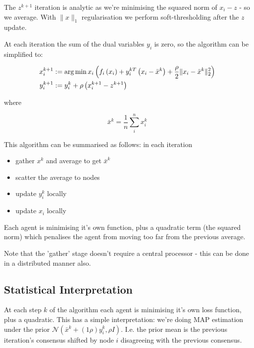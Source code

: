 \documentclass{article}
\begin{document}
\begin{example}[Consensus]
The \(z^{k+1}\) iteration is analytic as we're minimising the squared norm of \(x_i - z\) - so we average. With \(\|x\|_1\) regularisation we perform soft-thresholding after the \(z\) update.

At each iteration the sum of the dual variables \(y_i\) is zero, so the algorithm can be simplified to:

\begin{align}
x_i^{k+1} &:= \operatorname*{arg\,min}{x_i} \left(f_i\left( x_i \right) + y_i^{kT}\left(x_i-\bar{x}^k\right) + \frac{\rho}{2}\|x_i-\bar{x}^k\|_2^2\right)\\
y_i^{k+1} &:= y_i^{k} + \rho \left(x_i^{k+1} - z^{k+1} \right)
\label{simple_consensus_iterations}
\end{align}
 
where

\begin{equation}
\bar{x}^k = \frac{1}{n} \sum_i^n x_i^k
\end{equation}

This algorithm can be summarised as follows: in each iteration

\begin{itemize}
\item gather \(x^k\) and average to get \(\bar{x}^k\)
\item scatter the average to nodes
\item update \(y_i^k\) locally
\item update \(x_i\) locally
\end{itemize}

Each agent is minimising it's own function, plus a quadratic term (the squared norm) which penalises the agent from moving too far from the previous average.

Note that the 'gather' stage doesn't require a central processor - this can be done in a distributed manner also.
\end{example}

\subsection{Statistical Interpretation}
At each step \(k\) of the algorithm each agent is minimising it's own loss function, plus a quadratic.
This has a simple interpretation: we're doing MAP estimation under the prior \(\mathcal{N}\left(\bar{x}^{k} + \left(1\rho\right)y_i^k, \rho I\right)\). I.e. the prior mean is the previous iteration's consensus shifted by node \(i\) disagreeing with the previous consensus. 
\end{document}
